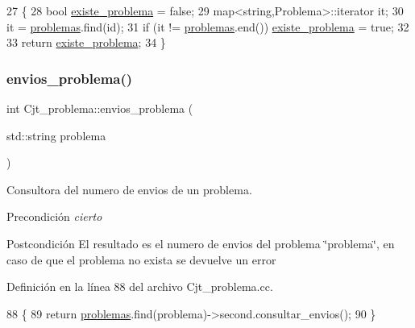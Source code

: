 \begin{DoxyCode}
27                                             \{
28     \textcolor{keywordtype}{bool} \mbox{\hyperlink{class_cjt__problema_a831be5b51e252520ee981b58d9ec00e9}{existe\_problema}} = \textcolor{keyword}{false};
29     map<string,Problema>::iterator it;
30     it = \mbox{\hyperlink{class_cjt__problema_a2d471986320805c5b27f8d14d486fca8}{problemas}}.find(\textcolor{keywordtype}{id});
31     \textcolor{keywordflow}{if} (it != \mbox{\hyperlink{class_cjt__problema_a2d471986320805c5b27f8d14d486fca8}{problemas}}.end()) \mbox{\hyperlink{class_cjt__problema_a831be5b51e252520ee981b58d9ec00e9}{existe\_problema}} = \textcolor{keyword}{true};
32 
33     \textcolor{keywordflow}{return} \mbox{\hyperlink{class_cjt__problema_a831be5b51e252520ee981b58d9ec00e9}{existe\_problema}};
34 \}
\end{DoxyCode}
\mbox{\label{class_cjt__problema_a8d153df869b2918083eb9451d3a0ab6a}} 
\subsubsection{\texorpdfstring{envios\+\_\+problema()}{envios\_problema()}}
{\footnotesize\ttfamily int Cjt\+\_\+problema\+::envios\+\_\+problema (\begin{DoxyParamCaption}\item[{std\+::string}]{problema }\end{DoxyParamCaption})}



Consultora del numero de envios de un problema. 

\begin{DoxyPrecond}{Precondición}
{\itshape cierto} 
\end{DoxyPrecond}
\begin{DoxyPostcond}{Postcondición}
El resultado es el numero de envios del problema \char`\"{}problema\char`\"{}, en caso de que el problema no exista se devuelve un error 
\end{DoxyPostcond}


Definición en la línea 88 del archivo Cjt\+\_\+problema.\+cc.


\begin{DoxyCode}
88                                                  \{
89   \textcolor{keywordflow}{return} \mbox{\hyperlink{class_cjt__problema_a2d471986320805c5b27f8d14d486fca8}{problemas}}.find(problema)->second.consultar\_envios();
90 \}
\end{DoxyCode}
\mbox{\label{class_cjt__problema_afaff62599264105423f37fd1503cfb19}} 
